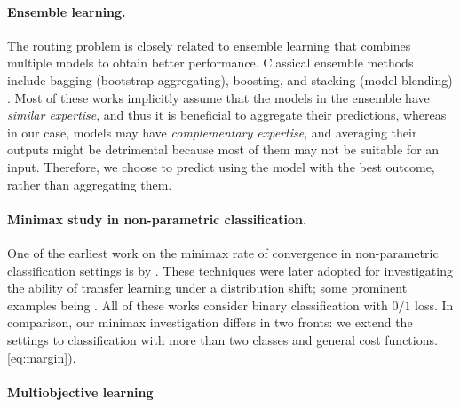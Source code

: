 \paragraph{Ensemble learning.} The routing problem is closely related to ensemble learning that combines multiple models to obtain better performance. Classical ensemble methods include bagging (bootstrap aggregating), boosting, and
stacking (model blending) \citep{breiman1996bagging,breiman1996stacked,freund1996experiments,friedman2001greedy,wolpert1992stacked}. Most of these works implicitly assume that the models in the ensemble have \emph{similar expertise}, and
thus it is beneficial to aggregate their predictions, whereas in our case, models may have \emph{complementary expertise}, and averaging their outputs might be detrimental because most of them may not be suitable for an input. Therefore, we choose to predict using the model with the best outcome, rather than aggregating them. 

\paragraph{Minimax study in non-parametric classification.} One of the earliest work on the minimax rate of convergence in non-parametric classification settings is by \citet{audibert2007Fast}. These techniques were later adopted for investigating the ability of transfer learning under a distribution shift; some prominent examples being \citep{kpotufe2018Marginal,cai2019Transfer,maity2020Minimax}. All of these works consider binary classification with $0/1$ loss. In comparison, our minimax investigation differs in two fronts: we extend the settings to classification with more than two classes and general cost functions. 
 \eqref{eq:margin}). 

\paragraph{Multiobjective learning}